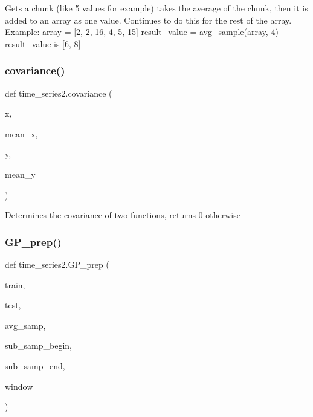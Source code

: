 \begin{DoxyVerb}Gets a chunk (like 5 values for example) takes the average of the chunk, then it is added to an array as one value. Continues to do this for the rest of the array.
Example: array = [2, 2, 16, 4, 5, 15]
result_value = avg_sample(array, 4)
result_value is [6, 8]\end{DoxyVerb}
 \mbox{\label{namespacetime__series2_afb06c28c1769268d33ce21dfae5d064a}} 
\subsubsection{\texorpdfstring{covariance()}{covariance()}}
{\footnotesize\ttfamily def time\+\_\+series2.\+covariance (\begin{DoxyParamCaption}\item[{}]{x,  }\item[{}]{mean\+\_\+x,  }\item[{}]{y,  }\item[{}]{mean\+\_\+y }\end{DoxyParamCaption})}

\begin{DoxyVerb}Determines the covariance of two functions, returns 0 otherwise\end{DoxyVerb}
 \mbox{\label{namespacetime__series2_a132464d53987913f012c331095a66ccd}} 
\subsubsection{\texorpdfstring{G\+P\+\_\+prep()}{GP\_prep()}}
{\footnotesize\ttfamily def time\+\_\+series2.\+G\+P\+\_\+prep (\begin{DoxyParamCaption}\item[{}]{train,  }\item[{}]{test,  }\item[{}]{avg\+\_\+samp,  }\item[{}]{sub\+\_\+samp\+\_\+begin,  }\item[{}]{sub\+\_\+samp\+\_\+end,  }\item[{}]{window }\end{DoxyParamCaption})}

